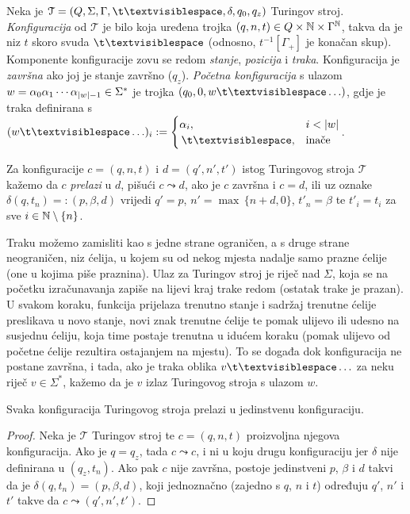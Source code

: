 \begin{definicija}[{name=[Turing-konfiguracije i prijelazi među njima]}]
Neka je $\mathcal T=(Q,\Sigma,\Gamma,\bl,\delta,q_0,q_z)$ Turingov stroj. \emph{Konfiguracija} od $\mathcal T$ je bilo koja uređena trojka $(q,n,t)\in Q\times{\mathbb N}\times\Gamma^{\mathbb N}$, takva da je niz $t$ skoro svuda $\bl$ (odnosno, $t^{-1}[\Gamma_+]$ je konačan skup). Komponente konfiguracije zovu se redom \emph{stanje}, \emph{pozicija} i \emph{traka}. Konfiguracija je \emph{završna} ako joj je stanje završno ($q_z$). \emph{Početna konfiguracija} s ulazom $w=\alpha_0\alpha_1\dotsm\alpha_{\lvert w\rvert-1}\in\Sigma^*$ je trojka $(q_0,0,w\bl\ldots)$, gdje je traka definirana s $(w\bl\ldots)_i:=\begin{cases}
\alpha_i,&i<\dulj{w}\\
\,\bl,&\text{inače}
\end{cases}$.

Za konfiguracije $c=(q,n,t)$ i $d=(q',n',t')$ istog Turingovog stroja $\mathcal T$ kažemo da $c$ \emph{prelazi} u $d$, pišući $c\leadsto d$, ako je $c$ završna i $c=d$, ili uz oznake $\delta(q,t_n)=:(p,\beta,d)$ vrijedi $q'=p$, $n'=\max\,\{n+d,0\}$, $t'_n=\beta$ te $t'_i=t_i$ za sve $i\in{\mathbb N}\setminus\{n\}$.
\end{definicija}

Traku možemo zamisliti kao s jedne strane ograničen, a s druge strane neograničen, niz ćelija, u kojem su od nekog mjesta nadalje samo prazne ćelije (one u kojima piše praznina). Ulaz za Turingov stroj je riječ nad $\Sigma$, koja se na početku izračunavanja zapiše na lijevi kraj trake redom (ostatak trake je prazan). U svakom koraku, funkcija prijelaza trenutno stanje i sadržaj trenutne ćelije preslikava u novo stanje, novi znak trenutne ćelije te pomak ulijevo ili udesno na susjednu ćeliju, koja time postaje trenutna u idućem koraku (pomak ulijevo od početne ćelije rezultira ostajanjem na mjestu). To se događa dok konfiguracija ne postane završna, i tada, ako je traka oblika $v\bl\ldots$ za neku riječ $v\in\Sigma^*$, kažemo da je $v$ izlaz Turingovog stroja s ulazom $w$.

\begin{lema}[{name=[determinističnost Turingovih strojeva]}]\label{lm:Turingdet}
Svaka konfiguracija Turingovog stroja prelazi u jedinstvenu konfiguraciju.%
\end{lema}
\begin{proof}
Neka je $\mathcal T$ Turingov stroj te $c=(q,n,t)$ proizvoljna njegova konfiguracija. Ako je $q=q_z$, tada $c\leadsto c$, i ni u koju drugu konfiguraciju jer $\delta$ nije definirana u $(q_z,t_n)$. Ako pak $c$ nije završna, postoje jedinstveni $p$, $\beta$ i $d$ takvi da je $\delta(q,t_n)=(p,\beta,d)$, koji jednoznačno (zajedno s $q$, $n$ i $t$) određuju $q'$, $n'$ i $t'$ takve da $c\leadsto(q',n',t')$.
\end{proof}

